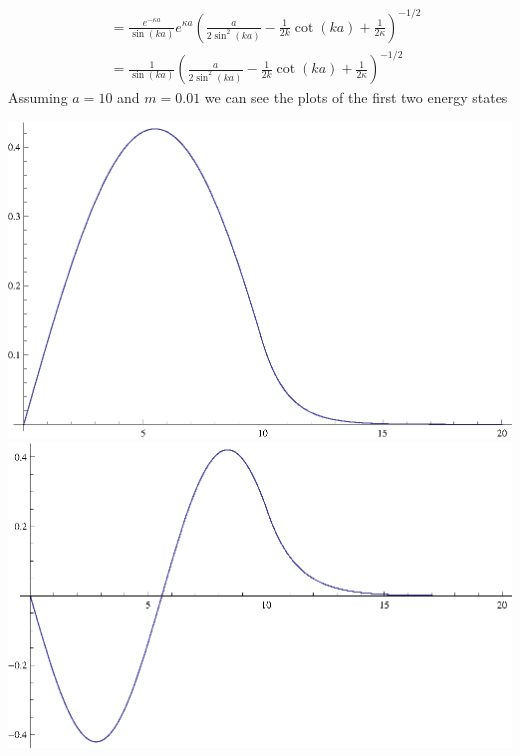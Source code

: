 \documentclass[11pt]{article}
\numberwithin{equation}{section}
\begin{document}
\begin{enumerate}[(a)]
\begin{align*}
&= \frac{e^{-\kappa a}}{\sin(ka)}e^{\kappa a}\left(\frac{a}{2\sin^2(ka)}-\frac{1}{2k}\cot(ka)+\frac{1}{2\kappa}\right)^{-1/2}\\
&= \frac{1}{\sin(ka)}\left(\frac{a}{2\sin^2(ka)}-\frac{1}{2k}\cot(ka)+\frac{1}{2\kappa}\right)^{-1/2}
\end{align*}
Assuming $a=10$ and $m=0.01$ we can see the plots of the first two energy states
\begin{center}
\includegraphics[scale=0.75]{Prob3.partd.eps}
\includegraphics[scale=0.75]{Prob3.partd2.eps}
\end{center}

\end{enumerate}
\end{document}
